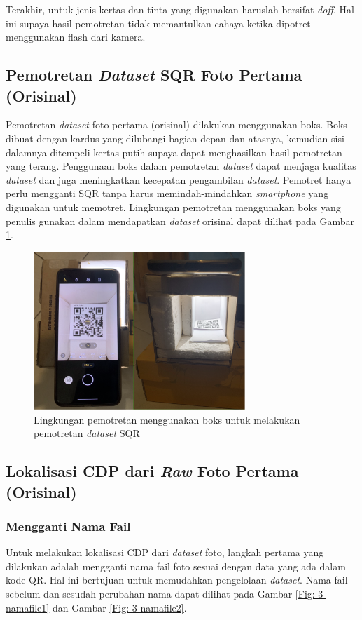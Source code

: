 \noindent Terakhir, untuk jenis kertas dan tinta yang digunakan haruslah bersifat \emph{doff}. Hal ini supaya hasil pemotretan tidak memantulkan cahaya ketika dipotret menggunakan flash dari kamera.

\subsection{Pemotretan \emph{Dataset} SQR Foto Pertama (Orisinal)} \label{Pemotretan Dataset SQR Foto Pertama (Orisinal)} Pemotretan \emph{dataset} foto pertama (orisinal) dilakukan menggunakan
boks. Boks dibuat dengan kardus yang dilubangi bagian depan dan atasnya, kemudian sisi dalamnya ditempeli kertas putih supaya dapat menghasilkan hasil
pemotretan yang terang. Penggunaan boks dalam pemotretan \emph{dataset} dapat menjaga kualitas \emph{dataset} dan juga meningkatkan kecepatan pengambilan
\emph{dataset}. Pemotret hanya perlu mengganti SQR tanpa harus memindah-mindahkan \emph{smartphone} yang digunakan untuk memotret. Lingkungan pemotretan
menggunakan boks yang penulis gunakan dalam mendapatkan \emph{dataset} orisinal dapat dilihat pada Gambar \ref{Fig: 3-lingkunganpemotretan}.

\begin{figure}[!h]
	\centering
	\includegraphics[width=8cm]{contents/chapter-3/3-environmentpemotretan.png}
	\caption{Lingkungan pemotretan menggunakan boks untuk melakukan pemotretan \emph{dataset} SQR}
	\label{Fig: 3-lingkunganpemotretan}
\end{figure}

\subsection{Lokalisasi CDP dari \emph{Raw} Foto Pertama (Orisinal)} \label{Lokalisasi CDP dari Raw Foto Pertama (Orisinal)}
\subsubsection{Mengganti Nama Fail}
Untuk melakukan lokalisasi CDP dari \emph{dataset} foto, langkah pertama yang dilakukan adalah mengganti nama fail foto sesuai dengan data yang ada dalam kode
QR. Hal ini bertujuan untuk memudahkan pengelolaan \emph{dataset}. Nama fail sebelum dan sesudah perubahan nama dapat dilihat pada Gambar \ref{Fig:
	3-namafile1} dan Gambar \ref{Fig: 3-namafile2}.

